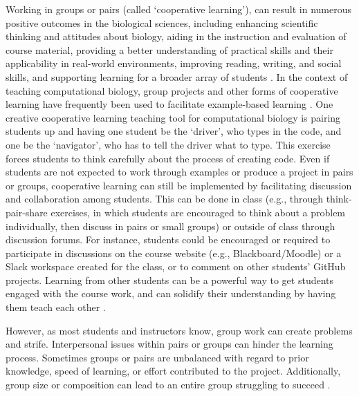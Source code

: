 Working in groups or pairs (called `cooperative learning'), can result in numerous positive outcomes in the biological sciences, including enhancing scientific thinking and attitudes about biology, aiding in the instruction and evaluation of course material, providing a better understanding of practical skills and their applicability in real-world environments, improving reading, writing, and social skills, and supporting learning for a broader array of students \citep[reviewed in][]{lord_101_2001}. 
In the context of teaching computational biology, group projects and other forms of cooperative learning have frequently been used to facilitate example-based learning  \citep[e.g.,][]{emery_application_2017,korcsmaros_teaching_2013,fuselier_trace_2011}.
One creative cooperative learning teaching tool for computational biology is pairing students up and having one student be the `driver', who types in the code, and one be the `navigator', who has to tell the driver what to type. 
This exercise forces students to think carefully about the process of creating code.
Even if students are not expected to work through examples or produce a project in pairs or groups, cooperative learning can still be implemented by facilitating discussion and collaboration among students.
This can be done in class (e.g., through think-pair-share exercises, in which students are encouraged to think about a problem individually, then discuss in pairs or small groups) or outside of class through discussion forums.
For instance, students could be encouraged or required to participate in discussions on the course website (e.g., Blackboard/Moodle) or a Slack workspace created for the class, or to comment on other students' GitHub projects. 
Learning from other students can be a powerful way to get students engaged with the course work, and can solidify their understanding by having them teach each other \citep{treisman1992studying}.

However, as most students and instructors know, group work can create problems and strife.
Interpersonal issues within pairs or groups can hinder the learning process.
Sometimes groups or pairs are unbalanced with regard to prior knowledge, speed of learning, or effort contributed to the project.
Additionally, group size or composition can lead to an entire group struggling to succeed \citep[e.g.,][]{compeau_establishing_2019}. 

